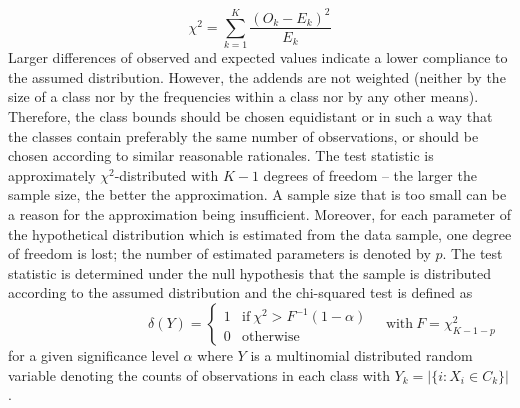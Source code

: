 \documentclass[a4paper, 12pt, titlepage, headsepline, listof = totoc, bibliography = totoc, numbers = noenddot]{scrartcl}
\begin{document}
\[\chi^2 = \sum_{k=1}^{K}\frac{(O_k - E_k)^2}{E_k}\]
Larger differences of observed and expected values indicate a lower compliance to the assumed distribution. However, the addends are not weighted (neither by the size of a class nor by the frequencies within a class nor by any other means). Therefore, the class bounds should be chosen equidistant or in such a way that the classes contain preferably the same number of observations, or should be chosen according to similar reasonable rationales. The test statistic is approximately $\chi^2$-distributed with $K-1$ degrees of freedom -- the larger the sample size, the better the approximation. A sample size that is too small can be a reason for the approximation being insufficient. Moreover, for each parameter of the hypothetical distribution which is estimated from the data sample, one degree of freedom is lost; the number of estimated parameters is denoted by $p$. The test statistic is determined under the null hypothesis that the sample is distributed according to the assumed distribution and the chi-squared test is defined as
\[
  \phantom{\quad\mbox{with}\ F=\chi^2_{K-1-p}}
  \delta(Y) =
   \left\{ 
    \begin{array}{cll}
                 1 & \mbox{if} \ \chi^2 > F^{-1}(1-\alpha)\\
                 0 & \mbox{otherwise}
    \end{array} 
   \right.
   \quad\mbox{with}\ F=\chi^2_{K-1-p}
\]
for a given significance level $\alpha$ where $Y$ is a multinomial distributed random variable denoting the counts of observations in each class with $Y_k = |\{i : X_i \in C_k\}|$.
\end{document}
